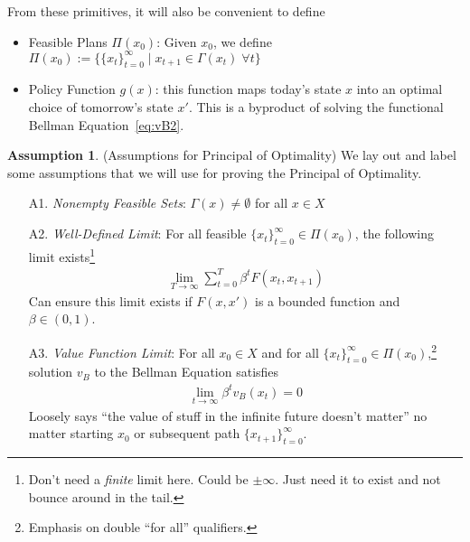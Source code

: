 \documentclass[12pt]{article}
\numberwithin{equation}{section} %
\theoremstyle{plain}
\theoremstyle{definition}
\newtheorem{assump}[thm]{Assumption}
\theoremstyle{remark}
\newcommand{\tinfz}{_{t=0}^\infty}
\begin{document}
From these primitives, it will also be convenient to define
\begin{itemize}

  \item Feasible Plans $\Pi(x_0)$:
    Given $x_0$,
    we define
    $\Pi(x_0) :=
    \big\{ \{x_t\}\tinfz \;|\; x_{t+1} \in \Gamma(x_t) \; \forall t\big\}$

  \item Policy Function $g(x)$: this function maps today's state $x$
    into an optimal choice of tomorrow's state $x'$. This is a byproduct
    of solving the functional Bellman Equation~\ref{eq:vB2}.
\end{itemize}

\clearpage
\begin{assump}(Assumptions for Principal of Optimality)
We lay out and label some assumptions that we will use for proving the
Principal of Optimality.
\begin{enumerate}
  \item[A1.] \emph{Nonempty Feasible Sets}:
    $\Gamma(x)\neq\emptyset$ for all $x\in X$

  \item[A2.] \emph{Well-Defined Limit}:
    For all feasible $\{x_{t}\}_{t=0}^\infty \in \Pi(x_0)$,
    the following limit exists\footnote{%
      Don't need a \emph{finite} limit here. Could be $\pm \infty$. Just
      need it to exist and not bounce around in the tail.
    }
    \begin{align*}
      \lim_{T\rightarrow\infty} \sum_{t=0}^T \beta^t F(x_t,x_{t+1})
    \end{align*}
    Can ensure this limit exists if $F(x,x')$ is a bounded function and
    $\beta \in (0,1)$.

  \item[A3.] \emph{Value Function Limit}:
    For all $x_0\in X$ and for all
    $\{x_{t}\}_{t=0}^\infty \in \Pi(x_0)$,\footnote{%
      Emphasis on double ``for all'' qualifiers.
    }
    solution $v_B$ to the Bellman Equation satisfies
    \begin{align*}
      \lim_{t\rightarrow\infty} \beta^t v_B(x_t) = 0
    \end{align*}
    Loosely says ``the value of stuff in the infinite future doesn't
    matter'' no matter starting $x_0$ or subsequent path
    $\{x_{t+1}\}_{t=0}^\infty$.
\end{enumerate}
\end{assump}
\end{document}
